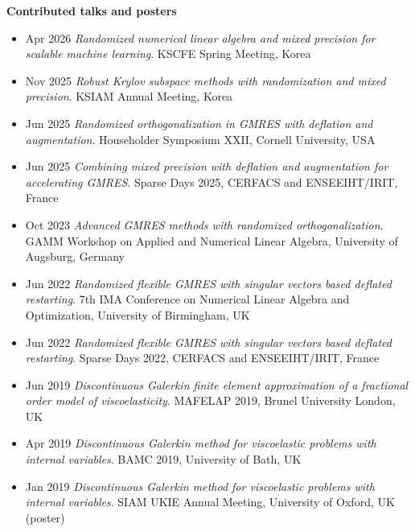 \documentclass[11pt, a4paper]{article}
\newcommand{\cvsubheading}[1]{%
    \needspace{3\baselineskip}\par\vspace{0.18cm}%
    {\sffamily\bfseries\small\color{accent!85!black}#1}\par\vspace{0.12cm}%
}
\newlength{\datecolwidth}
\newenvironment{cvlist}{%
    \begin{itemize}[
        leftmargin=\datecolwidth,
        labelwidth=\datecolwidth-0.3cm,
        labelsep=0.3cm,
        align=left,
        font=\sffamily\small\color{accent},
        topsep=0pt, partopsep=0pt, parsep=0pt,
        itemsep=0.20cm
    ]
}{\end{itemize}}
\begin{document}
\cvsubheading{Contributed talks and posters}
\begin{cvlist}
    \item[Apr 2026] \textit{Randomized numerical linear algebra and mixed precision for scalable machine learning}. KSCFE Spring Meeting, Korea
    \item[Nov 2025] \textit{Robust Krylov subspace methods with randomization and mixed precision}. KSIAM Annual Meeting, Korea
    \item[Jun 2025] \textit{Randomized orthogonalization in GMRES with deflation and augmentation}. Householder Symposium XXII, Cornell University, USA
    \item[Jun 2025] \textit{Combining mixed precision with deflation and augmentation for accelerating GMRES}. Sparse Days 2025, CERFACS and ENSEEIHT/IRIT, France
    \item[Oct 2023] \textit{Advanced GMRES methods with randomized orthogonalization}. GAMM Workshop on Applied and Numerical Linear Algebra, University of Augsburg, Germany
    \item[Jun 2022] \textit{Randomized flexible GMRES with singular vectors based deflated restarting}. 7th IMA Conference on Numerical Linear Algebra and Optimization, University of Birmingham, UK
    \item[Jun 2022] \textit{Randomized flexible GMRES with singular vectors based deflated restarting}. Sparse Days 2022, CERFACS and ENSEEIHT/IRIT, France
    \item[Jun 2019] \textit{Discontinuous Galerkin finite element approximation of a fractional order model of viscoelasticity}. MAFELAP 2019, Brunel University London, UK
    \item[Apr 2019] \textit{Discontinuous Galerkin method for viscoelastic problems with internal variables}. BAMC 2019, University of Bath, UK
    \item[Jan 2019] \textit{Discontinuous Galerkin method for viscoelastic problems with internal variables}. SIAM UKIE Annual Meeting, University of Oxford, UK (poster)
\end{cvlist}

\end{document}
